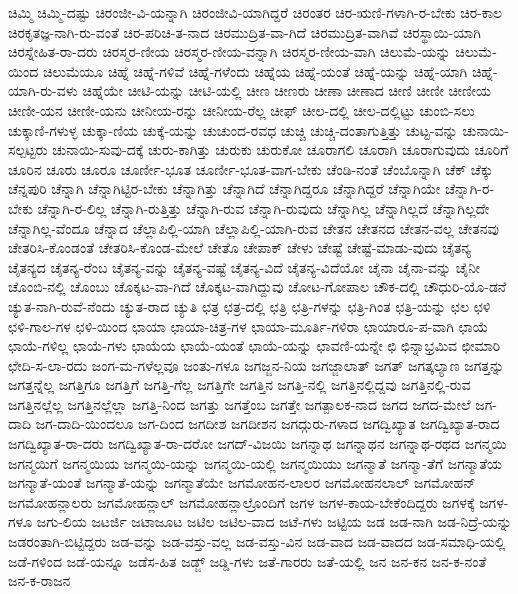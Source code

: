 {ಚಿಮ್ಮಿ
ಚಿಮ್ಮಿ-ದಷ್ಟು
ಚಿರಂಜೀ-ವಿ-ಯನ್ನಾಗಿ
ಚಿರಂಜೀವಿ-ಯಾಗಿದ್ದರೆ
ಚಿರಂತರ
ಚಿರ-ಋಣಿ-ಗಳಾಗಿ-ರ-ಬೇಕು
ಚಿರ-ಕಾಲ
ಚಿರಕೃತಜ್ಞ-ನಾಗಿ-ರು-ವಂತೆ
ಚಿರ-ಪರಿಚಿ-ತ-ನಾದ
ಚಿರಮುದ್ರಿತ-ವಾ-ಗಿದೆ
ಚಿರಮುದ್ರಿತ-ವಾಗಿವೆ
ಚಿರಸ್ಥಾಯಿ-ಯಾಗಿ
ಚಿರಸ್ನೇಹಿತ-ರಾ-ದರು
ಚಿರಸ್ಮರ-ಣೀಯ
ಚಿರಸ್ಮರ-ಣೀಯ-ವನ್ನಾಗಿ
ಚಿರಸ್ಮರ-ಣೀಯ-ವಾಗಿ
ಚಿಲುಮೆ-ಯನ್ನು
ಚಿಲುಮೆ-ಯಿಂದ
ಚಿಲುಮೆಯೂ
ಚಿಹ್ನೆ
ಚಿಹ್ನೆ-ಗಳಿವೆ
ಚಿಹ್ನೆ-ಗಳೆಂದು
ಚಿಹ್ನೆಯ
ಚಿಹ್ನೆ-ಯಂತೆ
ಚಿಹ್ನೆ-ಯನ್ನು
ಚಿಹ್ನೆ-ಯಾಗಿ
ಚಿಹ್ನೆ-ಯಾಗಿ-ರು-ವಳು
ಚಿಹ್ನೆಯೇ
ಚೀಟಿ-ಯನ್ನು
ಚೀಟಿ-ಯಲ್ಲಿ
ಚೀಣ
ಚೀಣರು
ಚೀಣಾ
ಚೀಣಾದ
ಚೀಣಿ
ಚೀಣೀ
ಚೀಣೀಯ
ಚೀಣೀ-ಯನ
ಚೀಣೀ-ಯನು
ಚೀನೀಯ-ರನ್ನು
ಚೀನೀಯ-ರೆಲ್ಲ
ಚೀಫ್
ಚೀಲ-ದಲ್ಲಿ
ಚೀಲ-ದಲ್ಲಿಟ್ಟು
ಚುಂಬಿ-ಸಲು
ಚುಕ್ಕಾಣಿ-ಗಳುಳ್ಳ
ಚುಕ್ಕಾ-ಣಿಯ
ಚುಕ್ಕೆ-ಯನ್ನು
ಚುಚುಂದ-ರವಧ
ಚುಚ್ಚಿ
ಚುಚ್ಚಿ-ದಂತಾಗುತ್ತಿತ್ತು
ಚುಟ್ಟ-ವನ್ನು
ಚುನಾಯಿ-ಸಲ್ಪಟ್ಟರು
ಚುನಾಯಿ-ಸುವು-ದಕ್ಕೆ
ಚುರು-ಕಾಗಿತ್ತು
ಚುರುಕು
ಚುರುಕೋ
ಚೂರಾಗಲಿ
ಚೂರಾಗಿ
ಚೂರಾಗುವುದು
ಚೂರಿಗೆ
ಚೂರಿನ
ಚೂರು
ಚೂರೂ
ಚೂರ್ಣೀ-ಭೂತ
ಚೂರ್ಣೀ-ಭೂತ-ವಾಗ-ಬೇಕು
ಚೆಂಡಿ-ನಂತೆ
ಚೆಂಬೊನ್ನಾಗಿ
ಚೆಕ್
ಚೆಕ್ಕು
ಚೆನ್ನಪುರಿ
ಚೆನ್ನಾಗಿ
ಚೆನ್ನಾಗಿಟ್ಟಿರ-ಬೇಕು
ಚೆನ್ನಾಗಿತ್ತು
ಚೆನ್ನಾಗಿದೆ
ಚೆನ್ನಾಗಿದ್ದರೂ
ಚೆನ್ನಾಗಿದ್ದರೆ
ಚೆನ್ನಾಗಿಯೇ
ಚೆನ್ನಾಗಿ-ರ-ಬೇಕು
ಚೆನ್ನಾಗಿ-ರ-ಲಿಲ್ಲ
ಚೆನ್ನಾಗಿ-ರುತ್ತಿತ್ತು
ಚೆನ್ನಾಗಿ-ರುವ
ಚೆನ್ನಾಗಿ-ರುವುದು
ಚೆನ್ನಾಗಿಲ್ಲ
ಚೆನ್ನಾಗಿಲ್ಲದೆ
ಚೆನ್ನಾಗಿಲ್ಲದೇ
ಚೆನ್ನಾಗಿಲ್ಲ-ವೆಂದೂ
ಚೆನ್ನಾದ
ಚೆಲ್ಲಾಪಿಲ್ಲಿ-ಯಾಗಿ
ಚೆಲ್ಲಾಪಿಲ್ಲಿ-ಯಾಗಿ-ರುವ
ಚೇತನ
ಚೇತನದ
ಚೇತನ-ವಲ್ಲ
ಚೇತನವು
ಚೇತರಿಸಿ-ಕೊಂಡಂತೆ
ಚೇತರಿಸಿ-ಕೊಂಡ-ಮೇಲೆ
ಚೇತೊ
ಚೇಪಾಕ್
ಚೇಳು
ಚೇಷ್ಟೆ
ಚೇಷ್ಟೆ-ಮಾಡು-ವುದು
ಚೈತನ್ಯ
ಚೈತನ್ಯದ
ಚೈತನ್ಯ-ರೆಂಬ
ಚೈತನ್ಯ-ವನ್ನು
ಚೈತನ್ಯ-ವಷ್ಟೆ
ಚೈತನ್ಯ-ವಿದೆ
ಚೈತನ್ಯ-ವಿದೆಯೋ
ಚೈನಾ
ಚೈನಾ-ವನ್ನು
ಚೈನೀ
ಚೊಂಬಿ-ನಲ್ಲಿ
ಚೊಂಬು
ಚೊಕ್ಕಟ-ವಾ-ಗಿದೆ
ಚೊಕ್ಕಟ-ವಾಗಿದ್ದುವು
ಚೋಟ-ಗೋಪಾಲ
ಚೌಕ-ದಲ್ಲಿ
ಚೌಧುರಿ-ಯೊ-ಡನೆ
ಚ್ಯುತ-ನಾಗಿ-ರುವೆ-ನೆಂದು
ಚ್ಯುತ-ರಾದ
ಚ್ಯುತಿ
ಛತ್ರ
ಛತ್ರ-ದಲ್ಲಿ
ಛತ್ರಿ
ಛತ್ರಿ-ಗಳನ್ನು
ಛತ್ರಿ-ಗಿಂತ
ಛತ್ರಿ-ಯನ್ನು
ಛಲ
ಛಳಿ
ಛಳಿ-ಗಾಲ-ಗಳ
ಛಳಿ-ಯಿಂದ
ಛಾಯಾ
ಛಾಯಾ-ಚಿತ್ರ-ಗಳ
ಛಾಯಾ-ಮೂರ್ತಿ-ಗಳಿರಾ
ಛಾಯಾರೂ-ಪ-ವಾಗಿ
ಛಾಯೆ
ಛಾಯೆ-ಗಳಿಲ್ಲ
ಛಾಯೆ-ಗಳು
ಛಾಯೆಯ
ಛಾಯೆ-ಯಂತೆ
ಛಾಯೆ-ಯನ್ನು
ಛಾವಣಿ-ಯನ್ನೇ
ಛಿ
ಛಿನ್ನಾಭ್ರಮಿವ
ಛೀಮಾರಿ
ಛೇದಿ-ಸ-ಲಾ-ರದು
ಜಂಗ-ಮ-ಗಳೆಲ್ಲವೂ
ಜಂತು-ಗಳೂ
ಜಗಜ್ಜನ-ನಿಯ
ಜಗಜ್ಜಾಲಾತ್
ಜಗತ್
ಜಗತ್ಕಲ್ಯಾಣ
ಜಗತ್ತನ್ನು
ಜಗತ್ತನ್ನೆಲ್ಲ
ಜಗತ್ತಿಗೂ
ಜಗತ್ತಿಗೆ
ಜಗತ್ತಿ-ಗೆಲ್ಲ
ಜಗತ್ತಿಗೇ
ಜಗತ್ತಿನ
ಜಗತ್ತಿ-ನಲ್ಲಿ
ಜಗತ್ತಿನಲ್ಲಿದ್ದವು
ಜಗತ್ತಿನಲ್ಲಿ-ರುವ
ಜಗತ್ತಿನಲ್ಲೆಲ್ಲ
ಜಗತ್ತಿನಲ್ಲೆಲ್ಲಾ
ಜಗತ್ತಿ-ನಿಂದ
ಜಗತ್ತು
ಜಗತ್ತೆಂಬ
ಜಗತ್ತೇ
ಜಗತ್ಪಾಲಕ-ನಾದ
ಜಗದ
ಜಗದ-ಮೇಲೆ
ಜಗ-ದಾದಿ
ಜಗ-ದಾದಿ-ಯಿಂದಲೂ
ಜಗ-ದಿಂದ
ಜಗದೀಶ
ಜಗದೀಶನ
ಜಗದ್ಗುರು-ಗಳಾದ
ಜಗದ್ವಿಖ್ಯಾತ
ಜಗದ್ವಿಖ್ಯಾತ-ರಾದ
ಜಗದ್ವಿಖ್ಯಾತ-ರಾ-ದರು
ಜಗದ್ವಿಖ್ಯಾತ-ರಾ-ದರೋ
ಜಗದ್-ವಿಜಯಿ
ಜಗನ್ನಾಥ
ಜಗನ್ನಾಥನ
ಜಗನ್ನಾಥ-ರಥದ
ಜಗನ್ಮಯಿ
ಜಗನ್ಮಯಿಗೆ
ಜಗನ್ಮಯಿಯ
ಜಗನ್ಮಯಿ-ಯನ್ನು
ಜಗನ್ಮಯಿ-ಯಲ್ಲಿ
ಜಗನ್ಮಯಿಯು
ಜಗನ್ಮಾತೆ
ಜಗನ್ಮಾ-ತೆಗೆ
ಜಗನ್ಮಾತೆಯ
ಜಗನ್ಮಾತೆ-ಯಂತೆ
ಜಗನ್ಮಾತೆ-ಯನ್ನು
ಜಗನ್ಮಾತೆಯೇ
ಜಗಮೋಹನ-ಲಾಲರ
ಜಗಮೋಹನಲಾಲ್
ಜಗಮೋಹನ್
ಜಗಮೋಹನ್ಲಾಲರು
ಜಗಮೋಹನ್ಲಾಲ್
ಜಗಮೋಹನ್ಲಾಲ್ರೊಂದಿಗೆ
ಜಗಳ
ಜಗಳ-ಕಾಯ-ಬೇಕೆಂದಿದ್ದರು
ಜಗಳಕ್ಕೆ
ಜಗಳ-ಗಳೂ
ಜಗು-ಲಿಯ
ಜಟರ್ಜಿ
ಜಟಾಜೂಟ
ಜಟಿಲ
ಜಟಿಲ-ವಾದ
ಜಟೆ-ಗಳು
ಜಟ್ಟಿಯ
ಜಡ
ಜಡ-ನಾಗಿ
ಜಡ-ನಿದ್ರೆ-ಯನ್ನು
ಜಡರಂತಾಗಿ-ಬಿಟ್ಟಿದ್ದರು
ಜಡ-ವನ್ನು
ಜಡ-ವಸ್ತು-ವಲ್ಲ
ಜಡ-ವಸ್ತು-ವಿನ
ಜಡ-ವಾದ
ಜಡ-ವಾದದ
ಜಡ-ಸಮಾಧಿ-ಯಲ್ಲಿ
ಜಡೆ-ಗಳಿಂದ
ಜಡೆ-ಯನ್ನೂ
ಜಡೆಸ-ಹಿತ
ಜಡ್ಜ್
ಜಡ್ಡಿ-ಗಳು
ಜತೆ-ಗಾರರು
ಜತೆ-ಯಲ್ಲಿ
ಜನ
ಜನ-ಕನ
ಜನ-ಕ-ನಂತೆ
ಜನ-ಕ-ರಾಜನ
}
